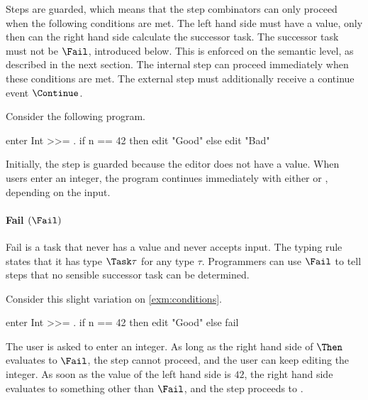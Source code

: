 Steps are guarded, which means that the step combinators can only proceed when the following conditions are met.
The left hand side must have a value, only then can the right hand side calculate the successor task.
The successor task must not be $\Fail$, introduced below.
This is enforced on the semantic level, as described in the next section.
The internal step can proceed immediately when these conditions are met.
The external step must additionally receive a continue event $\Continue$.


\begin{example}
\label{exm:conditions}

Consider the following program.
\begin{TASK}
  enter Int >>= \n. if n == 42 then edit "Good" else edit "Bad"
\end{TASK}
Initially, the step is guarded because the editor does not have a value.
When users enter an integer, the program continues immediately with either  or , depending on the input.

\end{example}




\paragraph{Fail $(\Fail)$}
\label{sub:fail}

Fail is a task that never has a value and never accepts input.
The typing rule  states that it has type $\Task \tau$ for any type $\tau$.
Programmers can use $\Fail$ to tell steps that no sensible successor task can be determined.

\begin{example}

Consider this slight variation on \cref{exm:conditions}.
\begin{TASK}
  enter Int >>= \n. if n == 42 then edit "Good" else fail
\end{TASK}
The user is asked to enter an integer.
As long as the right hand side of $\Then$ evaluates to $\Fail$, the step cannot proceed, and the user can keep editing the integer.
As soon as the value of the left hand side is $42$, the right hand side evaluates to something other than $\Fail$, and the step proceeds to .

\end{example}



